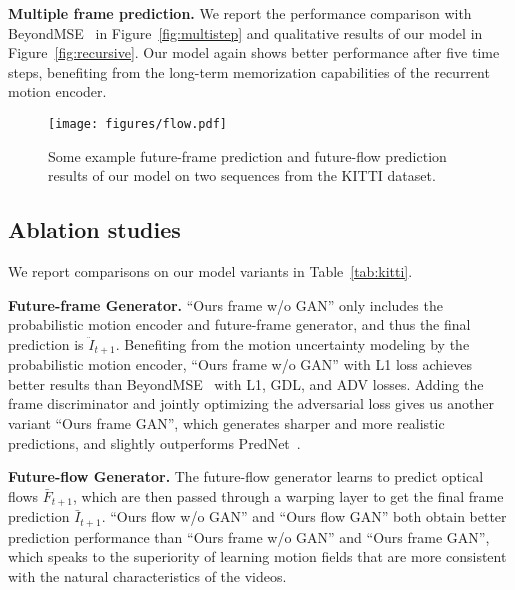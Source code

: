 \documentclass[10pt,twocolumn,letterpaper]{article}
\begin{document}
	\textbf{Multiple frame prediction.} We report the performance comparison with BeyondMSE~\cite{mathieu2015deep} in Figure~\ref{fig:multistep} and qualitative results of our model in Figure~\ref{fig:recursive}. Our model again shows better performance after five time steps, benefiting from the long-term memorization capabilities of the recurrent motion encoder.
	
	\begin{figure*}[!tp]
		\begin{center}
			\texttt{[image: figures/flow.pdf]}
			\caption{Some example future-frame prediction and future-flow prediction results of our model on two sequences from the KITTI dataset.} 
			\label{fig:flow}
		\end{center}
		\vspace{-7mm}
	\end{figure*}
	
	\subsection{Ablation studies}
	
	We report comparisons on our model variants in Table~\ref{tab:kitti}.
	
	\textbf{Future-frame Generator.} ``Ours frame w/o GAN'' only includes the probabilistic motion encoder and future-frame generator, and thus the final prediction is $\ddot{I}_{t+1}$. Benefiting from the motion uncertainty modeling by the probabilistic motion encoder, ``Ours frame w/o GAN'' with L1 loss achieves better results than BeyondMSE~\cite{mathieu2015deep} with L1, GDL, and ADV losses. Adding the frame discriminator and jointly optimizing the adversarial loss gives us another variant ``Ours frame GAN'', which generates sharper and more realistic predictions, and slightly outperforms PredNet~\cite{lotter2016deep}.
	
	\textbf{Future-flow Generator.} The future-flow generator learns to predict optical flows $\bar{F}_{t+1}$, which are then passed through a warping layer to get the final frame prediction $\bar{I}_{t+1}$. ``Ours flow w/o GAN'' and ``Ours flow GAN'' both obtain better prediction performance than ``Ours frame w/o GAN'' and ``Ours frame GAN'', which speaks to the superiority of learning motion fields that are more consistent with the natural characteristics of the videos. %
	
\end{document}
